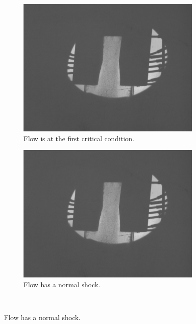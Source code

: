 \begin{figure}[htpb]
    \centering
    \begin{subfigure}{0.49\textwidth}
        \centering
        \includegraphics[width=\textwidth]{Figures/6-1st_critical_condition.tiff}
        \caption{Flow is at the first critical condition.}
        \label{fig:schlieren_first_critical}
    \end{subfigure}
    \begin{subfigure}{0.49\textwidth}
        \centering
        \includegraphics[width=\textwidth]{Figures/5-normal_shock_inside.tiff}
        \caption{Flow has a normal shock.}
        \label{fig:schlieren_normal_shock}
    \end{subfigure} \\

\end{figure}
